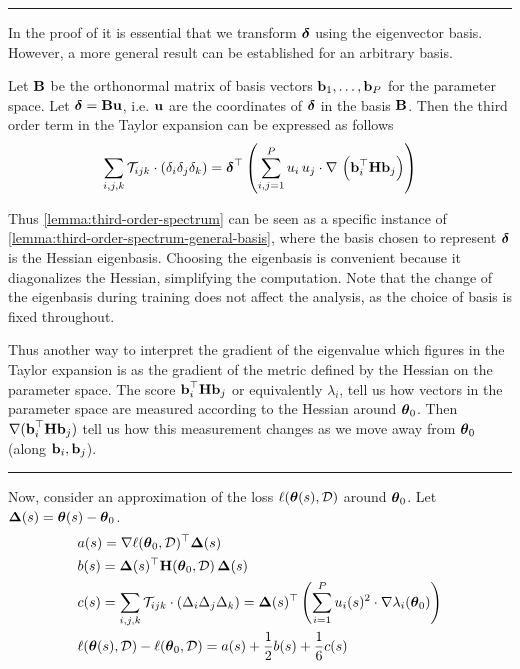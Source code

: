 \documentclass{article} %
\newcommand{\hessian}{\vH}
\newcommand{\lighthline}{\noindent\textcolor{gray!50}{\rule{\linewidth}{0.4pt}}}
\begin{document}
\lighthline

In the proof of  it is essential that we transform $\mbox{$\mbox{$\boldsymbol{\delta}$}$}$ using the eigenvector basis. However, a more general result can be established for an arbitrary basis. 

\begin{lemma}
\label{lemma:third-order-spectrum-general-basis}
Let $\mbox{$\mbox{$\mathbf{B}$}$}$ be the orthonormal matrix of basis vectors $\mbox{$\mbox{$\mathbf{b}$}$}_1, \dots, \mbox{$\mbox{$\mathbf{b}$}$}_P$ for the parameter space. Let $\mbox{$\mbox{$\boldsymbol{\delta}$}$} = \mbox{$\mbox{$\mathbf{B}$}$} \mbox{$\mbox{$\mathbf{u}$}$}$, i.e. $\mbox{$\mbox{$\mathbf{u}$}$}$ are the coordinates of $\mbox{$\mbox{$\boldsymbol{\delta}$}$}$ in the basis $\mbox{$\mbox{$\mathbf{B}$}$}$. Then the third order term in the Taylor expansion can be expressed as follows
\begin{equation}
    \label{eq:third-order-term-formula}
    \sum_{i,j,k}\mathcal{T}_{ijk}\cdot (\delta_i\delta_j\delta_k) = \vdelta^\top \rnd{\sum_{i,j=1}^P u_i\,u_j \cdot \grad\,\rnd{\vb_i^\top \hessian \vb_j}}
\end{equation}
\end{lemma}
Thus \cref{lemma:third-order-spectrum} can be seen as a specific instance of \cref{lemma:third-order-spectrum-general-basis}, where the basis chosen to represent $\mbox{$\mbox{$\boldsymbol{\delta}$}$}$ is the Hessian eigenbasis. Choosing the eigenbasis is convenient because it diagonalizes the Hessian, simplifying the computation. Note that the change of the eigenbasis  during training does not affect the analysis, as the choice of basis is fixed throughout.

Thus another way to interpret the gradient of the eigenvalue which figures in the Taylor expansion is as the gradient of the metric defined by the Hessian on the parameter space. The score $\vb_i^\top \hessian \vb_j$ or equivalently $\lambda_i$, tell us how vectors in the parameter space are measured according to the Hessian around $\mbox{$\mbox{$\boldsymbol{\theta}$}$}_0$. Then $\grad{(\vb_i^\top \hessian \vb_j)}$ tell us how this measurement changes as we move away from $\mbox{$\mbox{$\boldsymbol{\theta}$}$}_0$ (along $\mbox{$\mbox{$\mathbf{b}$}$}_i,\mbox{$\mbox{$\mathbf{b}$}$}_j$).

\lighthline


Now, consider an approximation of the loss $\ell(\mbox{$\mbox{$\boldsymbol{\theta}$}$}(s),\mbox{${\cal D}$})$ around $\mbox{$\mbox{$\boldsymbol{\theta}$}$}_0$. 
Let $\mbox{$\mbox{$\boldsymbol{\Delta}$}$}(s) = \mbox{$\mbox{$\boldsymbol{\theta}$}$}(s) - \mbox{$\mbox{$\boldsymbol{\theta}$}$}_0$. 
\begin{align}
    & a(s) = \grad\loss(\vparam_0, \data)^\top\vDelta(s)\\
    & b(s) = \vDelta(s)^\top\hessian(\vparam_0, \data)\,\vDelta(s)\\
    & c(s) = \sum_{i,j,k}\mathcal{T}_{ijk}\cdot (\Delta_i\Delta_j\Delta_k) = \vDelta(s)^\top \rnd{\sum_{i=1}^P u_i(s)^2 \cdot \grad\lambda_i(\vparam_0)}\\
    \label{eq:taylor-3}
    &\loss(\vparam(s), \data) - \loss(\vparam_0, \data) = a(s) + \frac{1}{2} b(s) + \frac{1}{6} c(s)
\end{align}
\end{document}

